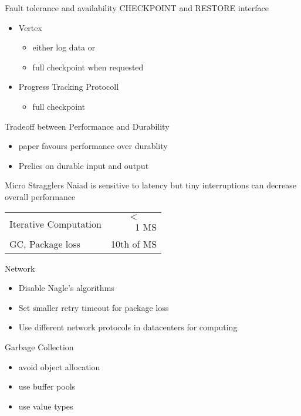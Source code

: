  \begin{frame}[t]{Fault tolerance and availability}
  \vspace{0.15cm}
  CHECKPOINT and RESTORE interface
   \begin{itemize}\setlength\itemsep{0.25cm}
     \item Vertex
	 \begin{itemize}\setlength\itemsep{0.25cm}
	 	\item either log data or
        \item full checkpoint when requested
	 \end{itemize}
     \item Progress Tracking Protocoll
     \begin{itemize}\setlength\itemsep{0.25cm}
     	\item full checkpoint
     \end{itemize}
   \end{itemize}

\end{frame}


 \begin{frame}[t]{}
  \vspace{0.15cm}
Tradeoff between Performance and Durability
   \begin{itemize}\setlength\itemsep{0.25cm}
     \item paper favours performance over durablity
     \item Prelies on durable input and output
   \end{itemize}

\end{frame}

 \begin{frame}[t]{Micro Stragglers}
  \vspace{0.15cm}
Naiad is sensitive to latency but tiny interruptions can decrease overall performance  

\begin{tabular}{ l r }
  Iterative Computation & $$<$$ 1 MS \\
  GC, Package loss   & 10th of MS \\
\end{tabular}

Network

\begin{itemize}\setlength\itemsep{0.25cm}
\item Disable Nagle's algorithms
\item Set smaller retry timeout for package loss
\item Use different network protocols in datacenters for computing
\end{itemize}

Garbage Collection

\begin{itemize}\setlength\itemsep{0.25cm}
\item avoid object allocation
\item use buffer pools
\item use value types
\end{itemize}

\end{frame}

